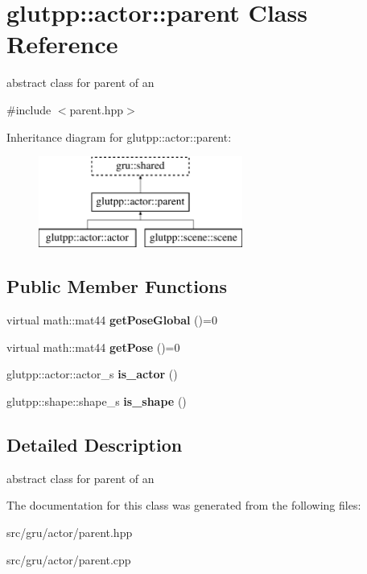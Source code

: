 \hypertarget{classglutpp_1_1actor_1_1parent}{\section{glutpp\-:\-:actor\-:\-:parent \-Class \-Reference}
\label{classglutpp_1_1actor_1_1parent}
}


abstract class for parent of an   




{\ttfamily \#include $<$parent.\-hpp$>$}

\-Inheritance diagram for glutpp\-:\-:actor\-:\-:parent\-:\begin{figure}[H]
\begin{center}
\leavevmode
\includegraphics[height=3.000000cm]{classglutpp_1_1actor_1_1parent}
\end{center}
\end{figure}
\subsection*{\-Public \-Member \-Functions}
\begin{DoxyCompactItemize}
\item 
\hypertarget{classglutpp_1_1actor_1_1parent_a8dc2485db2dd2d3d3b1dfa53e22c3dce}{virtual math\-::mat44 {\bfseries get\-Pose\-Global} ()=0}\label{classglutpp_1_1actor_1_1parent_a8dc2485db2dd2d3d3b1dfa53e22c3dce}

\item 
\hypertarget{classglutpp_1_1actor_1_1parent_aa7bd045f2b9e21eddb006998df78a39a}{virtual math\-::mat44 {\bfseries get\-Pose} ()=0}\label{classglutpp_1_1actor_1_1parent_aa7bd045f2b9e21eddb006998df78a39a}

\item 
\hypertarget{classglutpp_1_1actor_1_1parent_a8c58553ae09f5ef4e23145574ecc6a7b}{glutpp\-::actor\-::actor\-\_\-s {\bfseries is\-\_\-actor} ()}\label{classglutpp_1_1actor_1_1parent_a8c58553ae09f5ef4e23145574ecc6a7b}

\item 
\hypertarget{classglutpp_1_1actor_1_1parent_a6275ce6cf8f27d6cd17a3a8a11e6d9b2}{glutpp\-::shape\-::shape\-\_\-s {\bfseries is\-\_\-shape} ()}\label{classglutpp_1_1actor_1_1parent_a6275ce6cf8f27d6cd17a3a8a11e6d9b2}

\end{DoxyCompactItemize}


\subsection{\-Detailed \-Description}
abstract class for parent of an  

\-The documentation for this class was generated from the following files\-:\begin{DoxyCompactItemize}
\item 
src/gru/actor/parent.\-hpp\item 
src/gru/actor/parent.\-cpp\end{DoxyCompactItemize}
